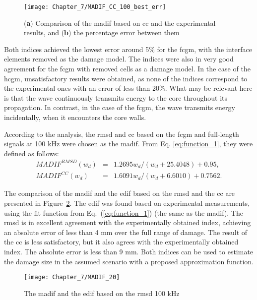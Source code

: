 \documentclass[11pt,a4paper,final]{report}
\theoremstyle{plain}
\begin{document}
\begin{figure}
	\begin{center}
		\texttt{[image: Chapter\_7/MADIF\_CC\_100\_best\_err]}
	\end{center}
	\caption{(\textbf{a}) Comparison of the \acf{madif} based on \acf{cc} and the experimental results, and (\textbf{b}) the percentage error between them}
	\label{fig:madif_cc_best}
\end{figure}

Both indices achieved the lowest error around 5\% for the \ac{fcgm}, with the interface elements removed as the damage model.
The indices were also in very good agreement for the \ac{fcgm} with removed cells as a damage model.
In the case of the \ac{hcgm}, unsatisfactory results were obtained, as none of the indices correspond to the experimental ones with an error of less than 20\%.
What may be relevant here is that the wave continuously transmits energy to the core throughout its propagation.
In contrast, in the case of the \ac{fcgm}, the wave transmits energy incidentally, when it encounters the core walls.

According to the analysis, the \ac{rmsd} and \ac{cc} based on the \ac{fcgm} and full-length signals at 100 \unit{kHz} were chosen as the \ac{madif}.
From Eq. \ref{eq:function_1}, they were defined as follows:
\begin{eqnarray}
	MADIF^{RMSD}(w_d) & = & {1.2695w_d}/(w_d+25.4048)+0.95,
	\label{eq:MADIF_RMSD}\\
	MADIF^{CC}(w_d) & = & 1.6091w_d/(w_d+6.6010)+0.7562.
	\label{eq:MADIF_CC}
\end{eqnarray}

The comparison of the \ac{madif} and the \ac{edif} based on the \ac{rmsd} and the \ac{cc} are presented in Figure~\ref{fig:madif_20}.
The \ac{edif} was found based on experimental measurements, using the fit function from Eq.~(\ref{eq:function_1}) (the same as the \ac{madif}).
The \ac{rmsd} is in excellent agreement with the experimentally obtained index, achieving an absolute error of less than 4 mm over the full range of damage.
The result of the \ac{cc} is less satisfactory, but it also agrees with the experimentally obtained index.
The absolute error is less than 9 mm.
Both indices can be used to estimate the damage size in the assumed scenario with a proposed approximation function.
\begin{figure}[!tbh]
	\begin{center}
		\texttt{[image: Chapter\_7/MADIF\_20]}
	\end{center}
	\caption{The \acl{madif} and the \acf{edif} based on the \acf{rmsd} 100 \unit{\kHz}}
	\label{fig:madif_20}
\end{figure}
\clearpage 
\end{document}

